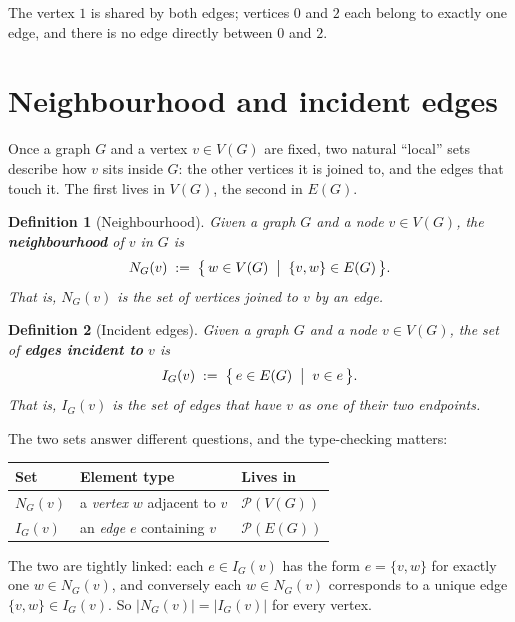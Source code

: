 \documentclass[11pt]{article}
\theoremstyle{defstyle}
\newtheorem{definition}{Definition}[section]
\theoremstyle{thmstyle}
\theoremstyle{notstyle}
\theoremstyle{cautionstyle}
\begin{document}
\noindent
The vertex $1$ is shared by both edges; vertices $0$ and $2$ each belong to
exactly one edge, and there is no edge directly between $0$ and $2$.

\section{Neighbourhood and incident edges}

Once a graph $G$ and a vertex $v \in V(G)$ are fixed, two natural ``local''
sets describe how $v$ sits inside $G$: the other vertices it is joined to,
and the edges that touch it. The first lives in $V(G)$, the second in
$E(G)$.

\begin{defbox}
\begin{definition}[Neighbourhood]
Given a graph $G$ and a node $v \in V(G)$, the \textbf{neighbourhood} of
$v$ in $G$ is
\[
  N_G(v) \;:=\; \bigl\{\, w \in V(G) \;\bigm|\; \{v, w\} \in E(G) \,\bigr\}.
\]
That is, $N_G(v)$ is the set of vertices joined to $v$ by an edge.
\end{definition}
\end{defbox}

\begin{defbox}
\begin{definition}[Incident edges]
Given a graph $G$ and a node $v \in V(G)$, the set of \textbf{edges
incident to} $v$ is
\[
  I_G(v) \;:=\; \bigl\{\, e \in E(G) \;\bigm|\; v \in e \,\bigr\}.
\]
That is, $I_G(v)$ is the set of edges that have $v$ as one of their two
endpoints.
\end{definition}
\end{defbox}

The two sets answer different questions, and the type-checking matters:

\begin{center}
\renewcommand{\arraystretch}{1.5}
\begin{tabular}{|l|l|l|}
\hline
\textbf{Set} & \textbf{Element type} & \textbf{Lives in} \\
\hline
$N_G(v)$ & a \emph{vertex} $w$ adjacent to $v$ & $\mathcal{P}(V(G))$ \\
$I_G(v)$ & an \emph{edge} $e$ containing $v$    & $\mathcal{P}(E(G))$ \\
\hline
\end{tabular}
\end{center}

\noindent
The two are tightly linked: each $e \in I_G(v)$ has the form $e = \{v, w\}$
for exactly one $w \in N_G(v)$, and conversely each $w \in N_G(v)$
corresponds to a unique edge $\{v, w\} \in I_G(v)$. So
$|N_G(v)| = |I_G(v)|$ for every vertex.
\end{document}
